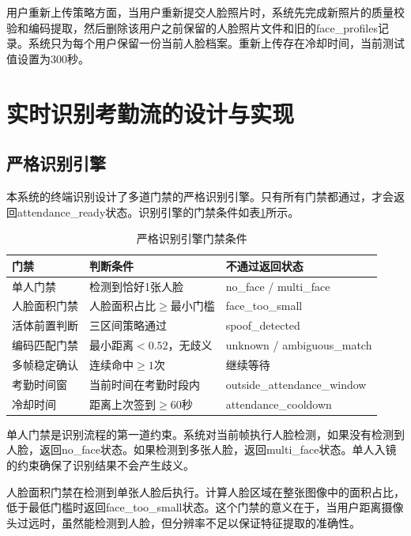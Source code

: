 用户重新上传策略方面，当用户重新提交人脸照片时，系统先完成新照片的质量校验和编码提取，然后删除该用户之前保留的人脸照片文件和旧的face\_profiles记录。系统只为每个用户保留一份当前人脸档案。重新上传存在冷却时间，当前测试值设置为300秒。

\section{实时识别考勤流的设计与实现}

\subsection{严格识别引擎}

本系统的终端识别设计了多道门禁的严格识别引擎。只有所有门禁都通过，才会返回attendance\_ready状态。识别引擎的门禁条件如表\ref{tab:gates}所示。

\begin{table}[htbp]
    \centering
    \caption{严格识别引擎门禁条件}
    \label{tab:gates}
    \begin{tabular}{lll}
        \toprule
        \textbf{门禁} & \textbf{判断条件} & \textbf{不通过返回状态} \\
        \midrule
        单人门禁 & 检测到恰好1张人脸 & no\_face / multi\_face \\
        人脸面积门禁 & 人脸面积占比$\geq$最小门槛 & face\_too\_small \\
        活体前置判断 & 三区间策略通过 & spoof\_detected \\
        编码匹配门禁 & 最小距离$< 0.52$，无歧义 & unknown / ambiguous\_match \\
        多帧稳定确认 & 连续命中$\geq 1$次 & 继续等待 \\
        考勤时间窗 & 当前时间在考勤时段内 & outside\_attendance\_window \\
        冷却时间 & 距离上次签到$\geq 60$秒 & attendance\_cooldown \\
        \bottomrule
    \end{tabular}
\end{table}

单人门禁是识别流程的第一道约束。系统对当前帧执行人脸检测，如果没有检测到人脸，返回no\_face状态。如果检测到多张人脸，返回multi\_face状态。单人入镜的约束确保了识别结果不会产生歧义。

人脸面积门禁在检测到单张人脸后执行。计算人脸区域在整张图像中的面积占比，低于最低门槛时返回face\_too\_small状态。这个门禁的意义在于，当用户距离摄像头过远时，虽然能检测到人脸，但分辨率不足以保证特征提取的准确性。

